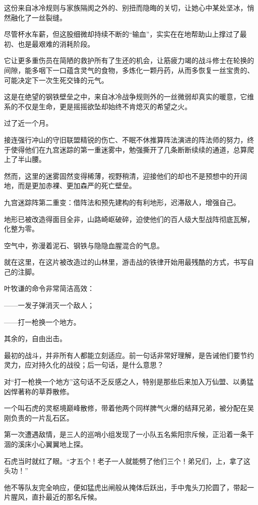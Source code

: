 这份来自冰冷规则与家族隔阂之外的、别扭而隐晦的关切，让她心中某处坚冰，悄然融化了一丝裂缝。

尽管杯水车薪，但这股细微却持续不断的“输血”，实实在在地帮助山上撑过了最初、也是最艰难的消耗阶段。

它让更多重伤员在简陋的救护所有了生还的机会，让筋疲力竭的战斗修士在轮换的间隙，能多咽下一口蕴含灵气的食物，多炼化一颗丹药，从而多恢复一丝宝贵的、可能决定下一次生死交锋的元气。

这是在绝望的钢铁壁垒之中，来自冰冷战争规则外的一丝微弱却真实的暖意，它维系的不仅是生命，更是摇摇欲坠却始终不肯熄灭的希望之火。

\vspace{2em}

过了近一个月。

接连强行冲山的守旧联盟精锐的伤亡、不眠不休推算阵法演进的阵法师的努力，终于使得他们在九宫迷踪的第一重迷雾中，勉强撕开了几条断断续续的通道，总算爬上了半山腰。

然而，这里的迷雾固然变得稀薄，视野稍清，迎接他们的却也不是预想中的开阔地，而是更加赤裸、更加森严的死亡壁垒。

九宫迷踪阵第二重变：借阵法和预先建构的有利地形，迟滞敌人，增强自己。

地形已被改造得面目全非，山路崎岖破碎，迫使他们的百人级大型战阵彻底瓦解，化整为零。

空气中，弥漫着泥石、钢铁与隐隐血腥混合的气息。

就在这里，在这片被改造过的山林里，游击战的铁律开始用最残酷的方式，书写自己的注脚。

叶牧谦的命令非常简洁高效：

——一发子弹消灭一个敌人；

——打一枪换一个地方。

其余的，自由出击。

最初的战斗，并非所有人都能立刻适应。前一句话非常好理解，是告诫他们要节约灵力，应对持久化的战役；后一句话，是什么意思？

对“打一枪换一个地方”这句话不乏反感之人，特别是那些后来加入万仙盟、以勇猛凶悍著称的草莽散修。

一个叫石虎的灵枢境巅峰散修，带着他两个同样脾气火爆的结拜兄弟，被分配在吴刚负责的一片乱石区。

第一次遭遇敌情，是三人的巡哨小组发现了一小队五名紫阳宗斥候，正沿着一条干涸的溪床小心翼翼地上探。

石虎当时就红了眼。“才五个！老子一人就能劈了他们三个！弟兄们，上，拿了这头功！”

他不等队友完全响应，便如猛虎出闸般从掩体后跃出，手中鬼头刀抡圆了，带起一片腥风，直扑最近的那名斥候。

